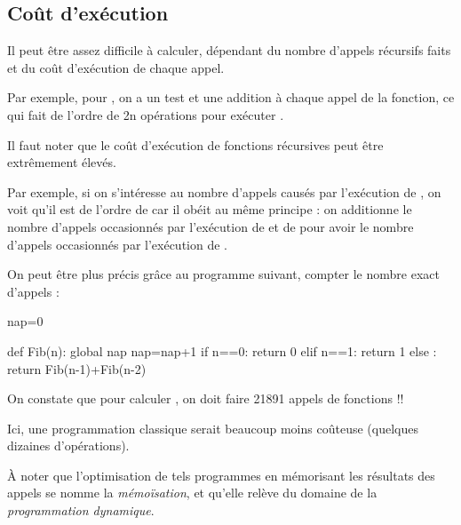 \documentclass[11pt,a4paper,french,twoside]{PMCours}
\begin{document}
\subsection{Coût d'exécution} 
Il peut être assez difficile à calculer, dépendant du nombre d'appels récursifs
faits et du coût d'exécution de chaque appel. 


Par exemple, pour , on a un test et une addition à chaque appel
de la fonction, ce qui fait de l'ordre de 2n opérations pour exécuter 
. 


Il faut noter que le coût d'exécution de fonctions récursives peut être 
extrêmement élevés.


Par exemple, si on s'intéresse au nombre d'appels causés par l'exécution de
, on voit qu'il est de l'ordre de  car il obéit 
au même principe : on additionne le nombre d'appels occasionnés par l'exécution 
de  et de  pour avoir le nombre d'appels 
occasionnés par l'exécution de .


On peut être plus précis grâce au programme suivant, compter 
le nombre exact d'appels :

\begin{Python}
nap=0

def Fib(n):
    global nap
    nap=nap+1
    if n==0:
        return 0
    elif n==1:
        return 1
    else :
        return Fib(n-1)+Fib(n-2)
\end{Python}

On constate que pour calculer ,
on doit faire 21891 appels de fonctions !! 

Ici, une programmation classique serait beaucoup moins coûteuse
(quelques dizaines d'opérations).

À noter que l'optimisation de tels programmes en mémorisant les résultats
des appels se nomme la \emph{mémoïsation}, et qu'elle relève du domaine 
de la \emph{programmation dynamique}.
 
\end{document}
